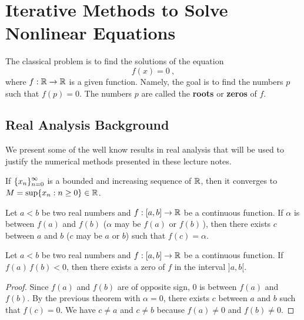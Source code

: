 \chapter{Iterative Methods to Solve Nonlinear Equations}
\label{chaptSeqA}

The classical problem is to find the solutions of the equation
\begin{equation} \label{equ1}
f(x)  = 0 \ ,
\end{equation}
where $f:\mathbb{R} \rightarrow \mathbb{R}$ is a given function.  Namely, the goal
is to find the numbers $p$ such that $f(p) = 0$.  The numbers $p$ are called
the {\bfseries roots} or
{\bfseries zeros} of $f$.

\section{Real Analysis Background}

We present some of the well know results in real analysis that will be
used to justify the numerical methods presented in these lecture notes.

\begin{theorem}
If $\displaystyle \{x_n\}_{n=0}^\infty$ is a bounded and increasing
sequence of $\mathbb{R}$, then it converges to
$M = \sup \{x_n : n \geq 0 \} \in \mathbb{R}$.
\label{Th0}
\end{theorem}

\begin{theorem}
Let $a<b$ be two real numbers and $f:[a,b] \rightarrow \mathbb{R}$ be a
continuous function.  If $\alpha$ is between $f(a)$ and
$f(b)$ ($\alpha$ may be $f(a)$ or $f(b)$\,), then there exists $c$
between $a$ and $b$ ($c$ may be $a$ or $b$) such that $f(c)=\alpha$.
\label{Th1}
\end{theorem}

\begin{cor}
Let $a<b$ be two real numbers and $f:[a,b] \rightarrow \mathbb{R}$ be a
continuous function.  If $f(a)\,f(b)<0$, then there exists a zero of
$f$ in the interval $]a,b[$.
\label{Cor1}
\end{cor}

\begin{proof}
Since $f(a)$ and $f(b)$ are of opposite sign, $0$ is between $f(a)$
and $f(b)$.  By the previous theorem with $\alpha = 0$, there exists
$c$ between $a$ and $b$ such that $f(c) = 0$.  We have $c \neq a$ and
$c \neq b$ because $f(a) \neq 0$ and $f(b) \neq 0$.
\end{proof}

